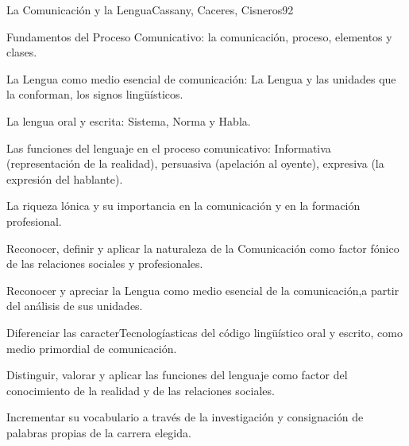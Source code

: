 \begin{syllabus}
\begin{unit}{La Comunicación y la Lengua}{Cassany, Caceres, Cisneros}{9}{2}
\begin{topics}
      \item Fundamentos del Proceso Comunicativo: la comunicación, proceso, elementos y clases. 
      \item La Lengua como medio esencial de comunicación: La Lengua y las unidades que  la conforman, los signos lingüísticos.
      \item La lengua oral y escrita: Sistema, Norma y Habla. 
      \item Las funciones del lenguaje en el proceso comunicativo: Informativa (representación de la realidad), persuasiva (apelación al oyente), expresiva (la expresión del hablante).
      \item La riqueza lónica y su importancia en la comunicación y en la formación profesional.
\end{topics}
\begin{learningoutcomes}
   \item Reconocer, definir y aplicar la naturaleza de la Comunicación como factor fónico de las relaciones sociales y profesionales.
   \item Reconocer y apreciar la Lengua como medio esencial de la comunicación,a partir del análisis de sus unidades.
   \item Diferenciar las caracterTecnologíasticas del código lingüístico oral y escrito,
   como medio primordial de comunicación.
   \item Distinguir, valorar y aplicar las funciones del lenguaje como factor del conocimiento de la realidad y de las relaciones sociales.
   \item Incrementar su vocabulario a través de la investigación y consignación de palabras propias de la carrera elegida.
\end{learningoutcomes}

\end{unit}


\end{syllabus}

